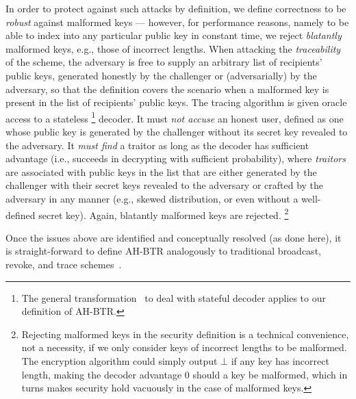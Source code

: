 In order to protect against such attacks by definition,
we define correctness to be \emph{robust} against malformed keys ---
however, for performance reasons, namely to be able to index into any particular public key in constant time,
we reject \emph{blatantly} malformed keys, e.g., those of incorrect lengths.
When attacking the \emph{traceability} of the scheme, the adversary is free to supply an arbitrary list of recipients' public keys, generated honestly by the challenger or (adversarially) by the adversary, so that the definition covers the scenario when a malformed key is present in the list of recipients' public keys.
The tracing algorithm is given oracle access to a stateless%
\footnote{The general transformation~\cite{DRM:KiaYun01,EC:BonSahWat06} to deal with stateful decoder applies to our definition of AH-BTR.}
decoder.
It must \emph{not accuse} an honest user, defined as one whose public key is generated by the challenger without its secret key revealed to the adversary.
It \emph{must find} a traitor as long as the decoder has sufficient advantage (i.e., succeeds in decrypting with sufficient probability), where \emph{traitors} are associated with public keys in the list that are either generated by the challenger with their secret keys revealed to the adversary or crafted by the adversary in any manner (e.g., skewed distribution, or even without a well-defined secret key).
Again, blatantly malformed keys are rejected.%
\footnote{Rejecting malformed keys in the security definition is a technical convenience, not a necessity, if we only consider keys of incorrect lengths to be malformed.
The encryption algorithm could simply output $\bot$ if any key has incorrect length, making the decoder advantage $0$ should a key be malformed,
which in turns makes security hold vacuously in the case of malformed keys.}

Once the issues above are identified and conceptually resolved (as done here),
it is straight-forward to define AH-BTR analogously to traditional broadcast, revoke, and trace schemes~\cite{FC:NaoPin00,C:NaoNaoLot01,C:GQWW19}.
